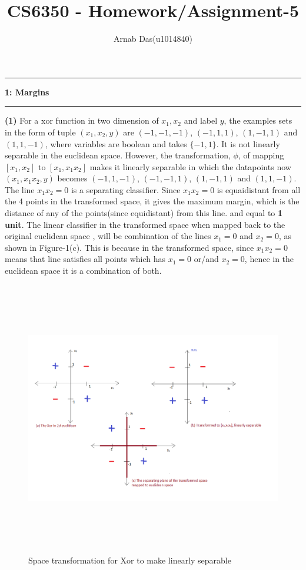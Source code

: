 \documentclass{article}
\title{CS6350 - Homework/Assignment-5}
\author{Arnab Das(u1014840)}
\newcommand\question[2]{\vspace{.25in}\hrule\textbf{#1: #2}\hrule\vspace{.10in}}
\renewcommand\part[1]{\vspace{.10in}\textbf{(#1)}}
\begin{document}
  \maketitle
  \newpage
  \newcommand\NAME{ARNAB DAS}
  \newcommand\UID{uxxxxxxx}
  \newcommand\HWNUM{4}

  \question{1}{Margins}
  \part{1} For a xor function in two dimension of $x_{1},x_{2}$ and label $y$, the examples sets in the form of tuple $(x_1, x_2, y)$ are $(-1,-1,-1)$, $(-1,1,1)$, $(1,-1,1)$ and $(1,1,-1)$, where variables are boolean and takes $\{-1,1\}$. It is not linearly separable in the euclidean space. However, the transformation, $\phi$, of mapping $[x_1, x_2]$ to $[x_1, x_1x_2]$ makes it linearly separable in which the datapoints now $(x_1, x_1x_2, y)$ becomes $(-1,1,-1)$, $(-1,-1,1)$, $(1,-1,1)$ and $(1,1,-1)$. The line $x_1x_2=0$ is a separating classifier. Since $x_1x_2=0$ is equaidistant from all the 4 points in the transformed space, it gives the maximum margin, which is the distance of any of the points(since equidistant) from this line. and equal to \textbf {1 unit}.  The linear classifier in the transformed space when mapped back to the original euclidean space , will be combination of the lines $x_1=0$ and $x_2=0$, as shown in Figure-1(c). This is because in the transformed space, since $x_1x_2=0$ means that line satisfies all points which has $x_1=0$ or/and $x_2=0$, hence in the euclidean space it is a combination of both. \newline

  \begin{figure}[H]
   \centering
  \includegraphics[width=12cm, height=12cm]{Prob1a}
  \caption{Space transformation for Xor to make linearly separable}
  \end{figure}
\end{document}
